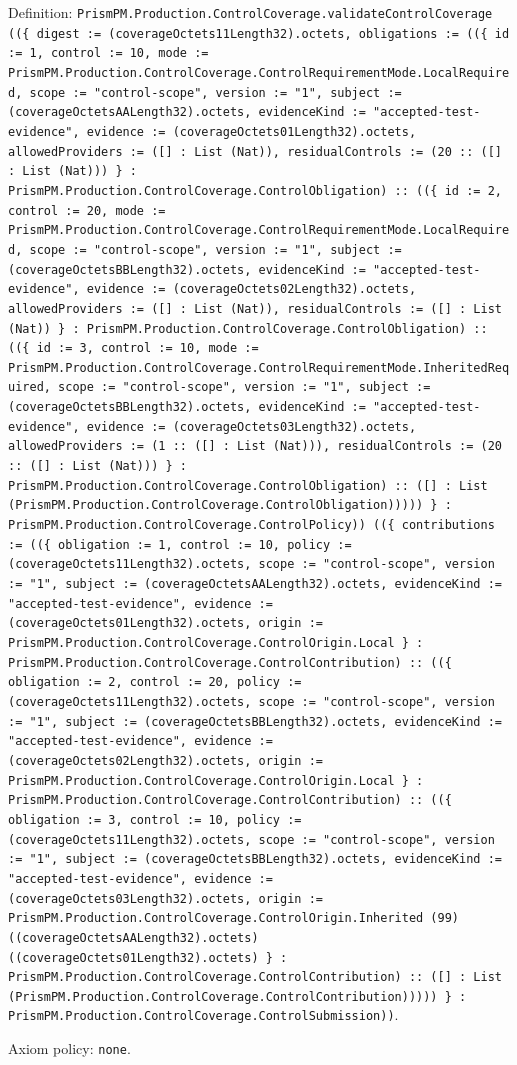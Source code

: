\documentclass[11pt]{article}
\begin{document}
\noindent Definition: \texttt{PrismPM.Production.ControlCoverage.validateControlCoverage ((\{ digest := (coverageOctets11Length32).octets, obligations := ((\{ id := 1, control := 10, mode := PrismPM.Production.ControlCoverage.ControlRequirementMode.LocalRequired, scope := "control-scope", version := "1", subject := (coverageOctetsAALength32).octets, evidenceKind := "accepted-test-evidence", evidence := (coverageOctets01Length32).octets, allowedProviders := ([] : List (Nat)), residualControls := (20 :: ([] : List (Nat))) \} : PrismPM.Production.ControlCoverage.ControlObligation) :: ((\{ id := 2, control := 20, mode := PrismPM.Production.ControlCoverage.ControlRequirementMode.LocalRequired, scope := "control-scope", version := "1", subject := (coverageOctetsBBLength32).octets, evidenceKind := "accepted-test-evidence", evidence := (coverageOctets02Length32).octets, allowedProviders := ([] : List (Nat)), residualControls := ([] : List (Nat)) \} : PrismPM.Production.ControlCoverage.ControlObligation) :: ((\{ id := 3, control := 10, mode := PrismPM.Production.ControlCoverage.ControlRequirementMode.InheritedRequired, scope := "control-scope", version := "1", subject := (coverageOctetsBBLength32).octets, evidenceKind := "accepted-test-evidence", evidence := (coverageOctets03Length32).octets, allowedProviders := (1 :: ([] : List (Nat))), residualControls := (20 :: ([] : List (Nat))) \} : PrismPM.Production.ControlCoverage.ControlObligation) :: ([] : List (PrismPM.Production.ControlCoverage.ControlObligation))))) \} : PrismPM.Production.ControlCoverage.ControlPolicy)) ((\{ contributions := ((\{ obligation := 1, control := 10, policy := (coverageOctets11Length32).octets, scope := "control-scope", version := "1", subject := (coverageOctetsAALength32).octets, evidenceKind := "accepted-test-evidence", evidence := (coverageOctets01Length32).octets, origin := PrismPM.Production.ControlCoverage.ControlOrigin.Local \} : PrismPM.Production.ControlCoverage.ControlContribution) :: ((\{ obligation := 2, control := 20, policy := (coverageOctets11Length32).octets, scope := "control-scope", version := "1", subject := (coverageOctetsBBLength32).octets, evidenceKind := "accepted-test-evidence", evidence := (coverageOctets02Length32).octets, origin := PrismPM.Production.ControlCoverage.ControlOrigin.Local \} : PrismPM.Production.ControlCoverage.ControlContribution) :: ((\{ obligation := 3, control := 10, policy := (coverageOctets11Length32).octets, scope := "control-scope", version := "1", subject := (coverageOctetsBBLength32).octets, evidenceKind := "accepted-test-evidence", evidence := (coverageOctets03Length32).octets, origin := PrismPM.Production.ControlCoverage.ControlOrigin.Inherited (99) ((coverageOctetsAALength32).octets) ((coverageOctets01Length32).octets) \} : PrismPM.Production.ControlCoverage.ControlContribution) :: ([] : List (PrismPM.Production.ControlCoverage.ControlContribution))))) \} : PrismPM.Production.ControlCoverage.ControlSubmission))}.\par
\noindent Axiom policy: \texttt{none}.\par
\end{document}

